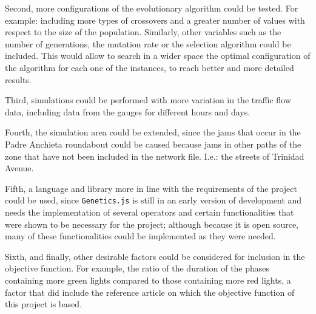 Second, more configurations of the evolutionary algorithm could be tested. For example: including more types of crossovers and a greater number of values with respect to the size of the population. Similarly, other variables such as the number of generations, the mutation rate or the selection algorithm could be included. This would allow to search in a wider space the optimal configuration of the algorithm for each one of the instances, to reach better and more detailed results.

Third, simulations could be performed with more variation in the traffic flow data, including data from the gauges for different hours and days.

Fourth, the simulation area could be extended, since the jams that occur in the Padre Anchieta roundabout could be caused because jams in other paths of the zone that have not been included in the network file. I.e.: the streets of Trinidad Avenue.

Fifth, a language and library more in line with the requirements of the project could be used, since \texttt{Genetics.js} is still in an early version of development and needs the implementation of several operators and certain functionalities that were shown to be necessary for the project; although because it is open source, many of these functionalities could be implemented as they were needed.

 Sixth, and finally, other desirable factors could be considered for inclusion in the objective function. For example, the ratio of the duration of the phases containing more green lights compared to those containing more red lights, a factor that did include the reference article on which the objective function of this project is based.

